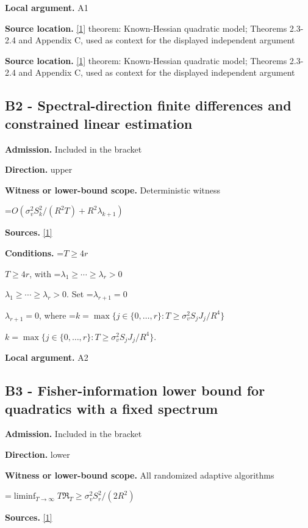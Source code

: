 \documentclass[10pt,a4paper]{article}
\newcommand{\AtlasMath}[1]{\par\begingroup\centering\setbox0=\hbox{$\displaystyle #1$}\ifdim\wd0>1.4\linewidth\typeout{ATLAS WIDE FORMULA: \the\wd0}\fi\ifdim\wd0>\linewidth\resizebox{\linewidth}{!}{\box0}\else\box0\fi\par\endgroup}
\newcommand{\AtlasInlineMath}[1]{\begingroup\setbox0=\hbox{$#1$}\ifdim\wd0>.4\linewidth\endgroup\AtlasMath{#1}\else\endgroup$#1$\fi}
\begin{document}
\textbf{Local argument.} A1

\textbf{Source location.} \href{https://proceedings.neurips.cc/paper_files/paper/2023/file/6e60a9023d2c63f7f0856910129ae753-Paper-Conference.pdf}{[1]} theorem: Known-Hessian quadratic model; Theorems 2.3-2.4 and Appendix C, used as context for the displayed independent argument

\textbf{Source location.} \href{https://proceedings.neurips.cc/paper_files/paper/2023/file/6e60a9023d2c63f7f0856910129ae753-Paper-Conference.pdf}{[1]} theorem: Known-Hessian quadratic model; Theorems 2.3-2.4 and Appendix C, used as context for the displayed independent argument

\subsection{B2 - Spectral-direction finite differences and constrained linear estimation}
\textbf{Admission.} Included in the bracket

\textbf{Direction.} upper

\textbf{Witness or lower-bound scope.} Deterministic witness

\AtlasMath{O(\sigma_v^2 S_k^2/(R^2T)+R^2\lambda_{k+1})}
\textbf{Sources.} \href{https://proceedings.neurips.cc/paper_files/paper/2023/file/6e60a9023d2c63f7f0856910129ae753-Paper-Conference.pdf}{[1]}

\textbf{Conditions.} \AtlasInlineMath{T\ge4r}, with \AtlasInlineMath{\lambda_1\ge\cdots\ge\lambda_r>0}. Set \AtlasInlineMath{\lambda_{r+1}=0}, where \AtlasInlineMath{k=\max\{j\in\{0,\ldots,r\}:T\ge\sigma_v^2S_jJ_j/R^4\}}.

\textbf{Local argument.} A2

\subsection{B3 - Fisher-information lower bound for quadratics with a fixed spectrum}
\textbf{Admission.} Included in the bracket

\textbf{Direction.} lower

\textbf{Witness or lower-bound scope.} All randomized adaptive algorithms

\AtlasMath{\liminf_{T\to\infty}T\mathfrak R_T\ge\sigma_v^2 S_r^2/(2R^2)}
\textbf{Sources.} \href{https://proceedings.neurips.cc/paper_files/paper/2023/file/6e60a9023d2c63f7f0856910129ae753-Paper-Conference.pdf}{[1]}
\end{document}

